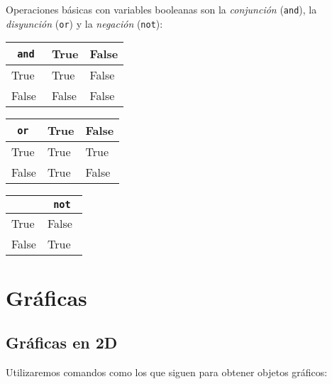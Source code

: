 \noindent\begin{minipage}{1\textwidth}
Operaciones básicas con variables booleanas son la \emph{conjunción}
(\lstinline|and|),
la \emph{disyunción} (\lstinline|or|) y la \emph{negación} (\lstinline|not|):

\mbox{}\hfill
\small
\begin{tabular}{*3{|l}|}
\hline
 \lstinline| and | & True & False\\
 \hline
 True & True & False\\
 \hline
 False & False & False\\
 \hline
\end{tabular}
\hfill
\begin{tabular}{*3{|l}|}
\hline
 \lstinline| or | & True & False\\
 \hline
 True & True & True\\
 \hline
 False & True & False\\
 \hline
\end{tabular}
\hfill
\begin{tabular}{*2{|l}|}
\hline
 & \lstinline| not | \\
 \hline
 True & False\\
 \hline
 False & True \\
 \hline
\end{tabular}
\hfill\mbox{}
\end{minipage}


\section{Gr\'aficas}




\subsection{Gr\'aficas en 2D}

Utilizaremos comandos como los que siguen para obtener objetos gráficos:

